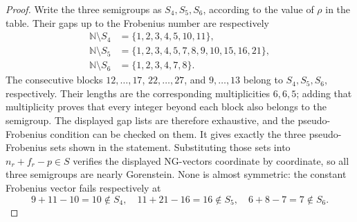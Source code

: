 \documentclass[10pt]{amsart}
\theoremstyle{plain}
\begin{document}
\begin{proof}
Write the three semigroups as \(S_4,S_5,S_6\), according to the value of
\(\rho\) in the table.  Their gaps up to the Frobenius number are respectively
\[
\begin{aligned}
\mathbb N\setminus S_4&=\{1,2,3,4,5,10,11\},\\
\mathbb N\setminus S_5&=\{1,2,3,4,5,7,8,9,10,15,16,21\},\\
\mathbb N\setminus S_6&=\{1,2,3,4,7,8\}.
\end{aligned}
\]
The consecutive blocks \(12,\ldots,17\), \(22,\ldots,27\), and
\(9,\ldots,13\) belong to \(S_4,S_5,S_6\), respectively.
Their lengths are the corresponding multiplicities \(6,6,5\); adding
that multiplicity proves that every integer beyond each block also
belongs to the semigroup.  The displayed gap lists are therefore
exhaustive, and the pseudo-Frobenius condition can be checked on them.  It gives exactly the three pseudo-Frobenius sets shown
in the statement.  Substituting those sets into \(n_r+f_r-p\in S\) verifies
the displayed NG-vectors coordinate by coordinate, so all three semigroups
are nearly Gorenstein.  None is almost symmetric: the constant Frobenius
vector fails respectively at
\[
9+11-10=10\notin S_4,
\quad
11+21-16=16\notin S_5,
\quad
6+8-7=7\notin S_6.
\]


\end{proof}
\end{document}
